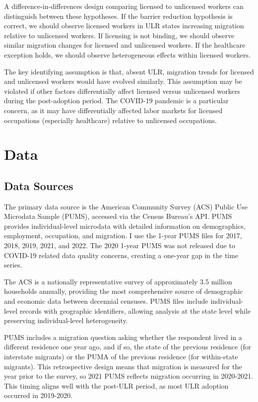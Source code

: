 \documentclass[12pt]{article}
\begin{document}
A difference-in-differences design comparing licensed to unlicensed workers can distinguish between these hypotheses. If the barrier reduction hypothesis is correct, we should observe licensed workers in ULR states increasing migration relative to unlicensed workers. If licensing is not binding, we should observe similar migration changes for licensed and unlicensed workers. If the healthcare exception holds, we should observe heterogeneous effects within licensed workers.

The key identifying assumption is that, absent ULR, migration trends for licensed and unlicensed workers would have evolved similarly. This assumption may be violated if other factors differentially affect licensed versus unlicensed workers during the post-adoption period. The COVID-19 pandemic is a particular concern, as it may have differentially affected labor markets for licensed occupations (especially healthcare) relative to unlicensed occupations.

\section{Data}

\subsection{Data Sources}

The primary data source is the American Community Survey (ACS) Public Use Microdata Sample (PUMS), accessed via the Census Bureau's API. PUMS provides individual-level microdata with detailed information on demographics, employment, occupation, and migration. I use the 1-year PUMS files for 2017, 2018, 2019, 2021, and 2022. The 2020 1-year PUMS was not released due to COVID-19 related data quality concerns, creating a one-year gap in the time series.

The ACS is a nationally representative survey of approximately 3.5 million households annually, providing the most comprehensive source of demographic and economic data between decennial censuses. PUMS files include individual-level records with geographic identifiers, allowing analysis at the state level while preserving individual-level heterogeneity.

PUMS includes a migration question asking whether the respondent lived in a different residence one year ago, and if so, the state of the previous residence (for interstate migrants) or the PUMA of the previous residence (for within-state migrants). This retrospective design means that migration is measured for the year prior to the survey, so 2021 PUMS reflects migration occurring in 2020-2021. This timing aligns well with the post-ULR period, as most ULR adoption occurred in 2019-2020.
\end{document}
